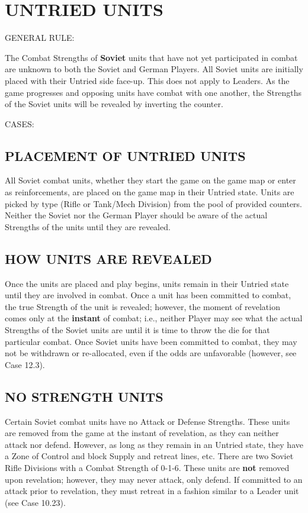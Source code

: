 \section{UNTRIED UNITS}

GENERAL RULE:

The Combat Strengths of \textbf{Soviet} units that have not yet participated in combat are unknown to both the Soviet and German Players. All Soviet units are initially placed with their Untried side face-up. This does not apply to Leaders. As the game progresses and opposing units have combat with one another, the Strengths of the Soviet units will be revealed by inverting the counter.

CASES:

\begin{flushleft}
  \subsection{PLACEMENT OF UNTRIED UNITS}
\end{flushleft}

All Soviet combat units, whether they start the game on the game map or enter as reinforcements, are placed on the game map in their Untried state. Units are picked by type (Rifle or Tank/Mech Division) from the pool of provided counters. Neither the Soviet nor the German Player should be aware of the actual Strengths of the units until they are revealed.

\subsection{HOW UNITS ARE REVEALED}

Once the units are placed and play begins, units remain in their Untried state until they are involved in combat. Once a unit has been committed to combat, the true Strength of the unit is revealed; however, the moment of revelation comes only at the \textbf{instant} of combat; i.e., neither Player may see what the actual Strengths of the Soviet units are until it is time to throw the die for that particular combat. Once Soviet units have been committed to combat, they may not be withdrawn or re-allocated, even if the odds are unfavorable (however, see Case 12.3).

\subsection{NO STRENGTH UNITS}

Certain Soviet combat units have no Attack or Defense Strengths. These units are removed from the game at the instant of revelation, as they can neither attack nor defend. However, as long as they remain in an Untried state, they have a Zone of Control and block Supply and retreat lines, etc. There are two Soviet Rifle Divisions with a Combat Strength of 0-1-6. These units are \textbf{not} removed upon revelation; however, they may never attack, only defend. If committed to an attack prior to revelation, they must retreat in a fashion similar to a Leader unit (see Case 10.23).

